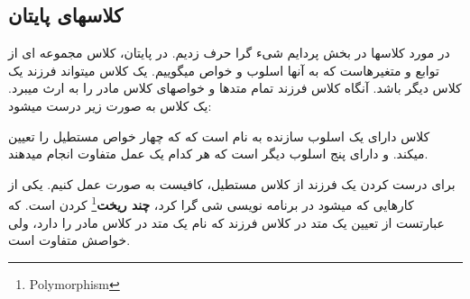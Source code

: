 \documentclass[14pt,a4paper]{memoir}
\begin{document}
	 	 	 \begin{latin}
	 	
	 \end{latin}
	 
	 \subsection{کلاسهای پایتان}\label{pythonclass}
	 
	 در مورد کلاسها در بخش پردایم شیء گرا حرف زدیم. در پایتان، کلاس مجموعه ای از توابع و متغیرهاست که به آنها اسلوب و خواص میگوییم. یک کلاس میتواند فرزند یک کلاس دیگر باشد. آنگاه کلاس فرزند تمام متدها و خواصهای کلاس مادر را به ارث میبرد. یک کلاس به صورت زیر درست میشود:
	 

	 

	 	 	 	 \begin{latin}
	 	
	 \end{latin}
	 
	 
	 کلاس  دارای یک اسلوب سازنده به نام  است که که چهار خواص مستطیل را تعیین میکند. و دارای پنج اسلوب دیگر است که هر کدام یک عمل متفاوت انجام میدهند.
	 
	  برای درست کردن یک فرزند از کلاس مستطیل، کافیست به صورت  عمل کنیم. یکی از کارهایی که میشود در برنامه نویسی شی گرا کرد، \textbf{چند ریخت}\footnote{Polymorphism} کردن است. که عبارتست از تعیین یک متد در کلاس فرزند که نام یک متد در کلاس مادر را دارد، ولی خواصش متفاوت است.
	 
\end{document}
